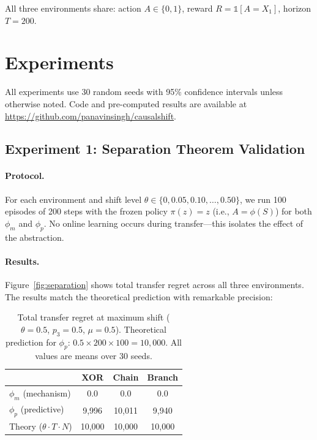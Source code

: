 \documentclass[runningheads]{llncs}
\newcommand{\phim}{\phi_m}
\newcommand{\phip}{\phi_p}
\begin{document}
All three environments share: action $A \in \{0, 1\}$, reward $R = \mathbb{1}[A = X_1]$, horizon $T = 200$.

\section{Experiments}
\label{sec:experiments}

All experiments use 30 random seeds with 95\% confidence intervals unless otherwise noted. Code and pre-computed results are available at \url{https://github.com/panavinsingh/causalshift}.

\subsection{Experiment 1: Separation Theorem Validation}
\label{sec:exp1}

\paragraph{Protocol.} For each environment and shift level $\theta \in \{0, 0.05, 0.10, \ldots, 0.50\}$, we run 100 episodes of 200 steps with the frozen policy $\pi(z) = z$ (i.e., $A = \phi(S)$) for both $\phim$ and $\phip$. No online learning occurs during transfer---this isolates the effect of the abstraction.

\paragraph{Results.} Figure~\ref{fig:separation} shows total transfer regret across all three environments. The results match the theoretical prediction with remarkable precision:

\begin{table}[t]
\caption{Total transfer regret at maximum shift ($\theta = 0.5$, $p_3 = 0.5$, $\mu = 0.5$). Theoretical prediction for $\phip$: $0.5 \times 200 \times 100 = 10{,}000$. All values are means over 30 seeds.}
\label{tab:separation}
\centering
\begin{tabular}{lccc}
\toprule
& \textbf{XOR} & \textbf{Chain} & \textbf{Branch} \\
\midrule
$\phim$ (mechanism) & 0.0 & 0.0 & 0.0 \\
$\phip$ (predictive) & 9{,}996 & 10{,}011 & 9{,}940 \\
Theory ($\theta \cdot T \cdot N$) & 10{,}000 & 10{,}000 & 10{,}000 \\
\bottomrule
\end{tabular}
\end{table}
\end{document}
